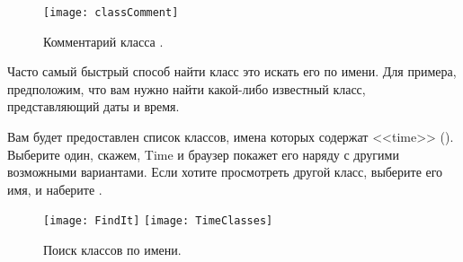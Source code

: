 \documentclass[a4paper,10pt,twoside]{book}
\begin{document}
\begin{figure}[hbt]
\centerline {\texttt{[image: classComment]}}
\caption{Комментарий класса .
}
\end{figure}


Часто самый быстрый способ найти класс это искать его по имени.
Для примера, предположим, что вам нужно найти какой-либо известный
класс, представляющий даты и время. 


\noindent
Вам будет предоставлен список классов, имена которых содержат
<<time>> (). Выберите один, скажем, Time и браузер
покажет его наряду с другими возможными вариантами.
Если хотите просмотреть другой класс, выберите его имя,
и наберите .
 

\begin{figure}[hbt]
\centerline{
	\texttt{[image: FindIt]}
	\hspace{1cm}
	\texttt{[image: TimeClasses]}
}
\caption{Поиск классов по имени.
}
\end{figure}

\end{document}
